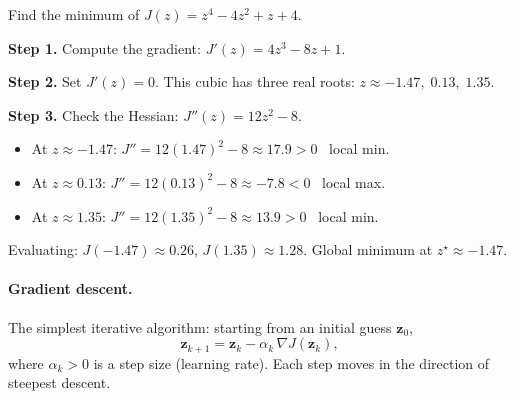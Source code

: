 \documentclass[11pt,twoside]{report}
\theoremstyle{definition}
\theoremstyle{plain}
\theoremstyle{remark}
\newcommand{\0}{\bm{0}}
\begin{document}
\begin{examplebox}
Find the minimum of $J(z)=z^{4}-4z^{2}+z+4$.

\textbf{Step 1.} Compute the gradient:
$J'(z)=4z^{3}-8z+1.$

\textbf{Step 2.} Set $J'(z)=0$. This cubic has three real roots: $z\approx -1.47,\; 0.13,\; 1.35$.

\textbf{Step 3.} Check the Hessian: $J''(z)=12z^{2}-8$.
\begin{itemize}
\item At $z\approx -1.47$: $J''=12(1.47)^{2}-8\approx 17.9>0$ \checkmark\ local min.
\item At $z\approx 0.13$: $J''=12(0.13)^{2}-8\approx -7.8<0$ \texttimes\ local max.
\item At $z\approx 1.35$: $J''=12(1.35)^{2}-8\approx 13.9>0$ \checkmark\ local min.
\end{itemize}
Evaluating: $J(-1.47)\approx 0.26$, $J(1.35)\approx 1.28$.  Global minimum at $z^{\star}\approx -1.47$.
\end{examplebox}

\begin{center}
\end{center}

\paragraph{Gradient descent.}
The simplest iterative algorithm: starting from an initial guess $\bm{z}_{0}$,
\begin{equation}
\bm{z}_{k+1}=\bm{z}_{k}-\alpha_{k}\,\nabla J(\bm{z}_{k}),
\end{equation}
where $\alpha_{k}>0$ is a step size (learning rate).
Each step moves in the direction of steepest descent.
\end{document}
